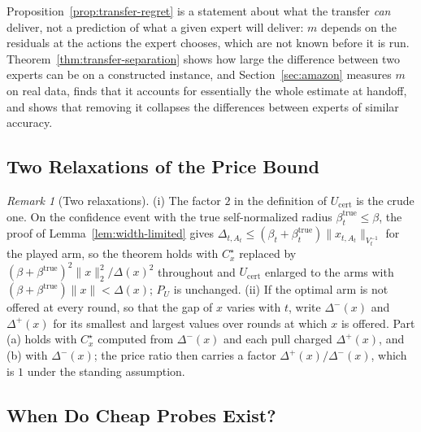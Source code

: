 \documentclass{article}
\theoremstyle{definition}
\theoremstyle{remark}
\newtheorem{remark}{Remark}
\theoremstyle{remark}
\begin{document}
Proposition~\ref{prop:transfer-regret} is a statement about what the transfer
\emph{can} deliver, not a prediction of what a given expert will deliver: $m$
depends on the residuals at the actions the expert chooses, which are not
known before it is run. Theorem~\ref{thm:transfer-separation} shows how large
the difference between two experts can be on a constructed instance, and
Section~\ref{sec:amazon} measures $m$ on real data, finds that it accounts for
essentially the whole estimate at handoff, and shows that removing it
collapses the differences between experts of similar accuracy.


\subsection{Two Relaxations of the Price Bound}
\label{app:relaxations}

\begin{remark}[Two relaxations]
\label{rem:relaxations}
(i) The factor $2$ in the definition of $U_{\mathrm{cert}}$ is the crude
one. On the confidence event with the true self-normalized radius
$\beta^{\mathrm{true}}_t\le\beta$, the proof of Lemma~\ref{lem:width-limited}
gives $\Delta_{t,A_t}\le(\beta_t+\beta^{\mathrm{true}}_t)\|x_{t,A_t}\|_{V_t^{-1}}$
for the played arm, so the theorem holds with $C^\star_x$ replaced by
$(\beta+\beta^{\mathrm{true}})^2\|x\|_2^2/\Delta(x)^2$ throughout and
$U_{\mathrm{cert}}$ enlarged to the arms with
$(\beta+\beta^{\mathrm{true}})\|x\|<\Delta(x)$; $P_U$ is unchanged. (ii) If the
optimal arm is not offered at every round, so that the gap of $x$ varies
with $t$, write $\Delta^-(x)$ and $\Delta^+(x)$ for its smallest and largest
values over rounds at which $x$ is offered. Part (a) holds with $C^\star_x$ computed
from $\Delta^-(x)$ and each pull charged $\Delta^+(x)$, and (b) with
$\Delta^-(x)$; the price ratio then carries a factor $\Delta^+(x)/\Delta^-(x)$,
which is $1$ under the standing assumption.
\end{remark}

\subsection{When Do Cheap Probes Exist?}
\label{app:cheap-probes}
\end{document}
